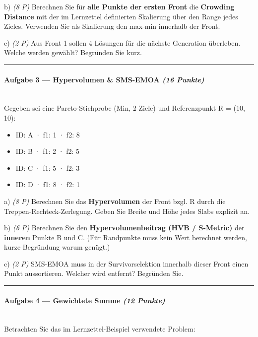 \documentclass[11pt, a4paper]{article}
\begin{document}
b) \textit{(8 P)} Berechnen Sie für \textbf{alle Punkte der ersten Front} die \textbf{Crowding Distance} mit der im Lernzettel definierten Skalierung über den Range jedes Zieles. Verwenden Sie als Skalierung den max-min innerhalb der Front.


c) \textit{(2 P)} Aus Front 1 sollen 4 Lösungen für die nächste Generation überleben. Welche werden gewählt? Begründen Sie kurz.



\noindent\textcolor{rulegray}{\rule{\linewidth}{0.4pt}}


\paragraph{Aufgabe 3 — Hypervolumen \& SMS-EMOA \textit{(16 Punkte)}}\mbox{}\\[2pt]

Gegeben sei eine Pareto-Stichprobe (Min, 2 Ziele) und Referenzpunkt R = (10, 10):


\begin{itemize}
  \item ID: A · f1: 1 · f2: 8
  \item ID: B · f1: 2 · f2: 5
  \item ID: C · f1: 5 · f2: 3
  \item ID: D · f1: 8 · f2: 1
\end{itemize}
a) \textit{(8 P)} Berechnen Sie das \textbf{Hypervolumen} der Front bzgl. R durch die Treppen-Rechteck-Zerlegung. Geben Sie Breite und Höhe jedes Slabs explizit an.


b) \textit{(6 P)} Berechnen Sie den \textbf{Hypervolumenbeitrag (HVB / S-Metric)} der \textbf{inneren} Punkte B und C. (Für Randpunkte muss kein Wert berechnet werden, kurze Begründung warum genügt.)


c) \textit{(2 P)} SMS-EMOA muss in der Survivorselektion innerhalb dieser Front einen Punkt aussortieren. Welcher wird entfernt? Begründen Sie.



\noindent\textcolor{rulegray}{\rule{\linewidth}{0.4pt}}


\paragraph{Aufgabe 4 — Gewichtete Summe \textit{(12 Punkte)}}\mbox{}\\[2pt]

Betrachten Sie das im Lernzettel-Beispiel verwendete Problem:
\end{document}
